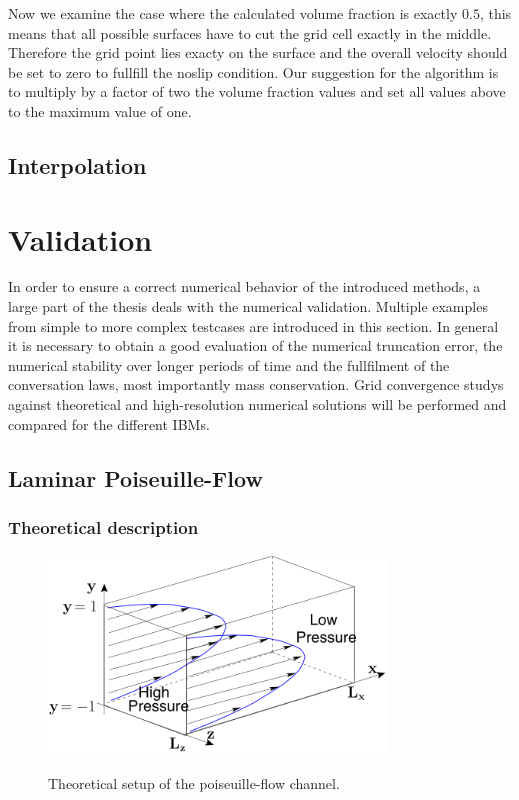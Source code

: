 Now we examine the case where the calculated volume fraction is exactly $0.5$, this means that all possible surfaces have to cut the grid cell exactly in the middle.
Therefore the grid point lies exacty on the surface and the overall velocity should be set to zero to fullfill the noslip condition.
Our suggestion for the algorithm  is to multiply by a factor of two the volume fraction values and set all values above to the maximum value of one.

\newpage
\subsection{Interpolation}

\newpage

\section{Validation}

In order to ensure a correct numerical behavior of the introduced methods, a large part of the thesis deals with the numerical validation.
Multiple examples from simple to more complex testcases are introduced in this section.
In general it is necessary to obtain a good evaluation of the numerical truncation error, the numerical stability over longer periods of time
and the fullfilment of the conversation laws, most importantly mass conservation.
Grid convergence studys against theoretical and high-resolution numerical solutions  will be performed
and compared for the different IBMs.


\subsection{Laminar Poiseuille-Flow}
\subsubsection{Theoretical description}

\begin{figure}[!bp]
  \centering
  \includegraphics[width=0.8\textwidth]{gfx/immersed_boundary/val_volpen/poiseuilleflow.png}\label{b}
  \caption{Theoretical setup of the poiseuille-flow channel.}
\end{figure}


